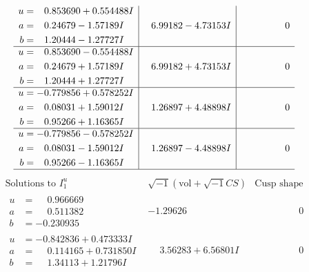 \documentclass[1p]{elsarticle_modified}
\theoremstyle{definition}
\newcommand{\I}{\sqrt{-1}}
\begin{document}
$$\begin{array}{c|c|c}
\begin{aligned}
u &= \phantom{-}0.853690 + 0.554488 I \\
a &= \phantom{-}0.24679 - 1.57189 I \\
b &= \phantom{-}1.20444 - 1.27727 I\end{aligned}
 & \phantom{-}6.99182 - 4.73153 I & \phantom{-0.000000 } 0 \\ \hline\begin{aligned}
u &= \phantom{-}0.853690 - 0.554488 I \\
a &= \phantom{-}0.24679 + 1.57189 I \\
b &= \phantom{-}1.20444 + 1.27727 I\end{aligned}
 & \phantom{-}6.99182 + 4.73153 I & \phantom{-0.000000 } 0 \\ \hline\begin{aligned}
u &= -0.779856 + 0.578252 I \\
a &= \phantom{-}0.08031 + 1.59012 I \\
b &= \phantom{-}0.95266 + 1.16365 I\end{aligned}
 & \phantom{-}1.26897 + 4.48898 I & \phantom{-0.000000 } 0 \\ \hline\begin{aligned}
u &= -0.779856 - 0.578252 I \\
a &= \phantom{-}0.08031 - 1.59012 I \\
b &= \phantom{-}0.95266 - 1.16365 I\end{aligned}
 & \phantom{-}1.26897 - 4.48898 I & \phantom{-0.000000 } 0\\
 \hline 
 \end{array}$$\newpage$$\begin{array}{c|c|c}  
\text{Solutions to }I^u_{1}& \I (\text{vol} + \sqrt{-1}CS) & \text{Cusp shape}\\
 \hline 
\begin{aligned}
u &= \phantom{-}0.966669\phantom{ +0.000000I} \\
a &= \phantom{-}0.511382\phantom{ +0.000000I} \\
b &= -0.230935\phantom{ +0.000000I}\end{aligned}
 & -1.29626\phantom{ +0.000000I} & \phantom{-0.000000 } 0 \\ \hline\begin{aligned}
u &= -0.842836 + 0.473333 I \\
a &= \phantom{-}0.114165 + 0.731850 I \\
b &= \phantom{-}1.34113 + 1.21796 I\end{aligned}
 & \phantom{-}3.56283 + 6.56801 I & \phantom{-0.000000 } 0 \\ \hline\begin{aligned}

\end{aligned}
\end{array}$$
\end{document}
